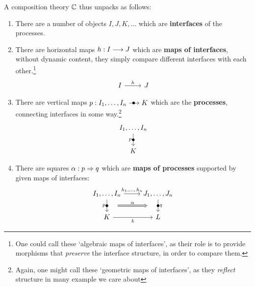 A composition theory $\Processes$ thus unpacks as follows:
\begin{enumerate}
	\item There are a number of objects $I, J, K, \ldots$ which are \textbf{interfaces} of the processes.%
	\item There are horizontal maps $h: I \longrightarrow J$ which are \textbf{maps of interfaces}, without dynamic content, they simply compare different interfaces with each other.\footnote{One could call these `algebraic maps of interfaces', as their role is to provide morphisms that \emph{preserve} the interface structure, in order to compare them.}
	\begin{equation}
		\begin{tikzcd}[ampersand replacement=\&]
			I \& J
			\arrow["h", from=1-1, to=1-2]
		\end{tikzcd}
	\end{equation}
	\item There are vertical maps $p : I_1, \ldots, I_n \verto K$  which are the \textbf{processes}, connecting interfaces in some way.\footnote{Again, one might call these `geometric maps of interfaces', as they \emph{reflect} structure in many example we care about}
	\begin{equation}
		\begin{tikzcd}[ampersand replacement=\&]
			I_1, \ldots, I_n \\
			K
			\arrow["p"', "\bullet"{marking}, from=1-1, to=2-1]
		\end{tikzcd}
	\end{equation}
	\item There are squares $\alpha : p \Rightarrow q$ which are \textbf{maps of processes} supported by given maps of interfaces:
	\begin{equation}
		\begin{tikzcd}[ampersand replacement=\&]
			{I_1, \ldots, I_n} \& {J_1, \ldots, J_n} \\
			K \& L
			\arrow["{h_1, \ldots,\, h_n}", from=1-1, to=1-2]
			\arrow[""{name=0, anchor=center, inner sep=0}, "p"', "\bullet"{marking}, from=1-1, to=2-1]
			\arrow["k"', from=2-1, to=2-2]
			\arrow[""{name=1, anchor=center, inner sep=0}, "q", "\bullet"{marking}, from=1-2, to=2-2]
			\arrow["\alpha", shorten <=15pt, shorten >=15pt, Rightarrow, from=0, to=1]
		\end{tikzcd}
	\end{equation}
\end{enumerate}

